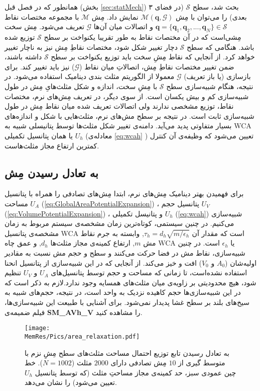 همانطور که در فصل قبل (بخش 
\ref{sec:statMech})
بحث شد، سطح
$\mathcal{S}$
(در فضای ۳ بعدی) را می‌توان با مِش
$\mathcal{M}({\bm q},\mathcal{G})$
نمایش داد. مِش
$\mathcal{M}$
با مجموعه مختصات نقاط 
${\bm q}=\{{\bm q_1},{\bm q_2},...,{\bm q_N}\} \in \mathcal{S}$
و اتصالات میان آن‌ها
$\mathcal{G}$
تعریف می‌شود. مِش سخت مِشی‌است که در آن مختصات نقاط به طور تقریبا یکنواخت بر سطح 
$\mathcal{S}$
توزیع شده‌ باشد. هنگامی که سطح 
$\mathcal{S}$
دچار تغییر شکل شود، مختصات نقاطِ مِش نیز به ناچار تغییر خواهد کرد. از آنجایی که نقاط مِشِ سخت باید  توزیع یکنواخت بر سطح
$\mathcal{S}$
داشته باشند، ضمن تغییر مختصات نقاطِ مِش، اتصالاتِ میان نقاط
($\mathcal{G}$)
نیز باید تغییر کند. برای بازسازی (یا باز تعریف) 
$\mathcal{G}$
معمولا از الگوریتم مثلث بندی دینامیک 
\cite{Boal1992PRA, Gompper1992Science}
استفاده می‌شود. در نتیجه، هنگام شبیه‌سازی سطح
$\mathcal{S}$
با مِشِ سخت، اندازه و شکل مثلث‌هایِ مِش در طول شبیه‌سازی ‌کم و بیش یکسان است. از سوی دیگر، در تعریف مِش‌های نرم، مختصات نقاط،  توزیع مشخصی ندارند ولی اتصالات تعریف شده میان نقاط مِش در طول شبیه‌سازی ثابت است. در نتیجه بر سطح مش‌های نرم، مثلث‌هایی با شکل و اندازه‌های بسیار متفاوتی پدید می‌آید.  دامنه‌ی تغییر شکل مثلث‌ها توسط پتانیسلی شبیه به 
WCA 
یا همان پتانسیل تکمیلی 
$U_h$
(معادله‌ی 
\ref{eq:wcah}
) تعیین می‌شود که وظیفه‌ی آن کنترل کمترین ارتفاع مجاز مثلث‌هاست. 


\subsection{\label{sec:MeshEquilibration}
به تعادل رسیدن مِش
}

برای فهمیدن بهتر دینامیک مِش‌های نرم، ابتدا مِش‌های تصادفی را همراه با پتانسیل مساحت
$U_A$ (\ref{eq:GlobalAreaPotentialExpansion})
، پتانسیل حجم 
$U_V$ (\ref{eq:VolumePotentialExpansion})
، و پتانیسل تکمیلی 
$U_h$ (\ref{eq:wcah})
 شبیه‌سازی می‌کنیم. در چنین سیستمی، کوتاه‌ترین زمان مشخصه‌ی سیستم مربوط به زمان مشخصه‌ی پتانسیل 
WCA
است که مقدار آن
 $\tau_h=d_h\sqrt{m/\epsilon_h}$,
وابسته به جرم نقاط مش
$m$,
ارتفاع کمینه‌ی مجاز مثلث‌ها
$d_h$,
و عمق چاه 
WCA
یا 
$\epsilon_h$
است. در چنین شبیه‌سازی، نقاط مش در فضا حرکت می‌کنند و سطح و حجم مش نسبت به مقادیر اولیه‌شان 
($A_0$
و
$V_0$)
افت و خیز می‌کند. از آنجایی که در این شبیه‌سازی از پتانسیل انحنا استفاده نشده‌است، تا زمانی که مساحت و حجم توسط پتانسیل‌های
$U_A$
و
$U_V$
تنظیم شود، هیچ محدودیتی بر زاویه‌ی میان مثلث‌های همسایه وجود ندارد.لازم به ذکر است که در این شبیه‌سازی‌ها حجم کاهیده نزدیک به واحد است، در نتیجه، حجم‌های شبیه به سیخ‌های بلند بر سطح غشا پدیدار نمی‌شود. برای آشنایی با طبیعت این شبیه‌سازی‌ها، فیلم ضمیمه‌ی 
\textbf{SM\_AVh\_V}
را مشاهده کنید.
\begin{figure}[htbp]
\begin{center}
\texttt{[image: \\MemRes/Pics/area\_relaxation.pdf]}
\caption{
به تعادل رسیدن تابع توزیع احتمال مساحت مثلث‌های سطح مِشِ نزم با متوسط گیری از 
$10$
 مِش‌ تصادفی دارای
$2000$
مثلث 
($N=1002$).
خط چین عمودی سبز، حد کمینه‌ی مجاز مساحتِ مثلث (که توسط پتانسیل
$U_h$
تعیین می‌شود) را نشان می‌دهد.
}
\label{fig:areaRelaxation}
\end{center}
\end{figure}


